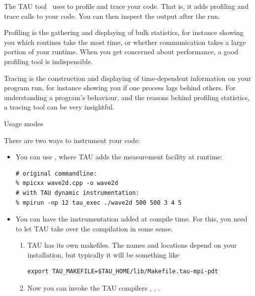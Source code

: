 

The TAU tool~\cite{TAU:ijhpca,TAUhomepage}
uses  to profile and trace your code. That is, it adds 
profiling and trace calls to your code. You can then inspect
the output after the run.

Profiling is the
gathering and displaying of bulk statistics, for instance showing you
which routines take the most time, or whether communication takes a
large portion of your runtime. When you get concerned about
performance, a good profiling tool is indispensible.

Tracing is the construction and displaying of time-dependent
information on  your program run, for instance showing you if one
process lags behind others. For understanding a program's behaviour,
and the reasons behind profiling statistics, a tracing tool can be
very insightful.

 {Usage modes}

There are two ways to instrument your code:
\begin{itemize}
\item You can use , where TAU adds the measurement facility at runtime:
\begin{verbatim}
# original commandline:
% mpicxx wave2d.cpp -o wave2d
# with TAU dynamic instrumentation:
% mpirun -np 12 tau_exec ./wave2d 500 500 3 4 5
\end{verbatim}
\item You can have the instrumentation added at compile time. For
  this, you need to let TAU take over the compilation in some sense.
  \begin{enumerate}
  \item TAU has its own makefiles. The names and locations depend on
    your installation, but typically it will be something like
\begin{verbatim}
export TAU_MAKEFILE=$TAU_HOME/lib/Makefile.tau-mpi-pdt
\end{verbatim}
  \item Now you can invoke the TAU compilers , , .
  \end{enumerate}
\end{itemize}

